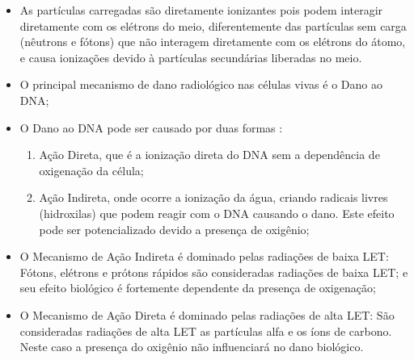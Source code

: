 \documentclass[11pt,a4paper]{article}
\begin{document}
            \begin{itemize}
                \item As partículas carregadas são diretamente ionizantes pois podem interagir diretamente com os elétrons do meio, diferentemente das partículas sem carga (nêutrons e fótons) que não interagem diretamente com os elétrons do átomo, e causa ionizações devido à partículas secundárias liberadas no meio. 
                
                \item O principal mecanismo de dano radiológico nas células vivas é o Dano ao DNA;
                
                \item O Dano ao DNA pode ser causado por duas formas :
                
                    \begin{enumerate}
                        \item Ação Direta, que é a ionização direta do DNA sem a dependência de oxigenação da célula;
                        \item Ação Indireta, onde ocorre a ionização da água, criando radicais livres (hidroxilas) que podem reagir com o DNA causando o dano. Este efeito pode ser potencializado devido a presença de oxigênio;
                    \end{enumerate}
                
                \item O Mecanismo de Ação Indireta é dominado pelas radiações de baixa LET: Fótons, elétrons e prótons rápidos são consideradas radiações de baixa LET; e seu efeito biológico é fortemente dependente da presença de oxigenação;
                
                \item O Mecanismo de Ação Direta é dominado pelas radiações de alta LET: São consideradas radiações de alta LET as partículas alfa e os íons de carbono. Neste caso a presença do oxigênio não influenciará no dano biológico. 
            \end{itemize}
            


        

\end{document}
